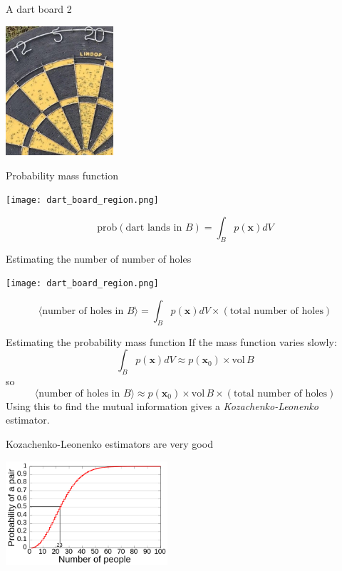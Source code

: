 \documentclass{beamer}
\begin{document}
\begin{frame}{A dart board 2}
\color{reddish}
\begin{center}
\includegraphics[width=4cm]{dart_board_zoom.png}
\end{center}
\color{black}
\end{frame}


\begin{frame}{Probability mass function}
\begin{center}
\texttt{[image: dart\_board\_region.png]}
\end{center}
\color{dark}
$$\mbox{prob}(\mbox{dart lands in }B)=\int_B p(\mathbf{x})dV$$
\color{black}
\end{frame}


\begin{frame}{Estimating the number of number of holes}
\color{reddish}
\begin{center}
\texttt{[image: dart\_board\_region.png]}
\end{center}
\color{black}
$$\langle \mbox{number of holes in }B\rangle = \int_B p(\mathbf{x})dV \times (\mbox{total number of holes})$$
\end{frame}


\begin{frame}{Estimating the probability mass function}
\color{black}
If the mass function varies slowly:
\color{dark}
$$\int_B p(\mathbf{x})dV\approx p(\mathbf{x}_0) \times \mbox{vol}\,B$$
\color{black}
so
\color{dark}
$$\langle \mbox{number of holes in }B\rangle \approx p(\mathbf{x}_0) \times \mbox{vol}\,B \times (\mbox{total number of holes})$$
\color{black}
Using this to find the mutual information gives a \textsl{Kozachenko-Leonenko} estimator.
\end{frame}


\begin{frame}{Kozachenko-Leonenko estimators are very good}
\color{reddish}
\begin{center}
\includegraphics[width=6cm]{Birthday_Paradox.png}
\end{center}
\color{black}
\vfill
\color{gray}
\color{black}
\end{frame}
\end{document}

